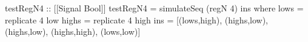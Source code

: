 \begin{haskellcode}
    testRegN4 :: [[Signal Bool]]
    testRegN4 = simulateSeq (regN 4) ins
        where
            lows  = replicate 4 low
            highs = replicate 4 high
            ins   = [(lows,high), (highs,low), (highs,low), (highs,high), (lows,low)]
\end{haskellcode}
